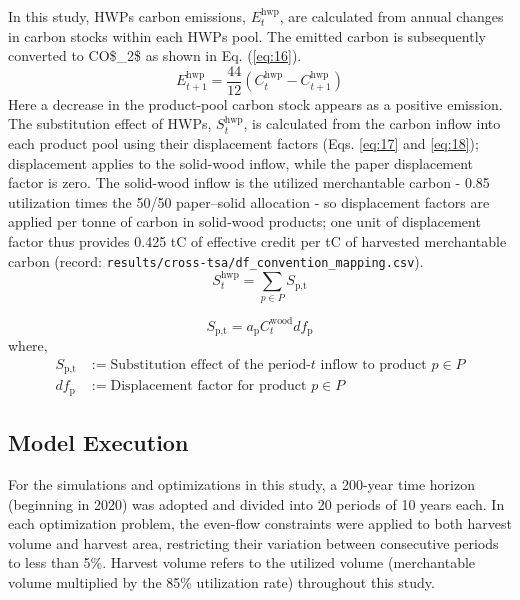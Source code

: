 \documentclass[preprint,12pt,authoryear]{elsarticle}
\begin{document}
\begin{linenumbers}
In this study, \acp{HWP} carbon emissions, $E_t^{\text{hwp}}$, are calculated from annual changes in carbon stocks within each \acp{HWP} pool. The emitted carbon is subsequently converted to \ac{CO$_2$} as shown in Eq. (\ref{eq:16}).
\begin{equation}
E_{t+1}^{\text{hwp}} = \frac{44}{12}(C_{t}^{\text{hwp}} - C_{t+1}^{\text{hwp}})
\label{eq:16}
\end{equation}
Here a decrease in the product-pool carbon stock appears as a positive emission.
The substitution effect of \acp{HWP}, $S_t^{\text{hwp}}$, is calculated from the carbon inflow into each product pool using their displacement factors (Eqs. \ref{eq:17} and \ref{eq:18}); displacement applies to the solid-wood inflow, while the paper displacement factor is zero. The solid-wood inflow is the utilized merchantable carbon - 0.85 utilization times the 50/50 paper--solid allocation - so displacement factors are applied per tonne of carbon in solid-wood products; one unit of displacement factor thus provides 0.425 tC of effective credit per tC of harvested merchantable carbon (record: \texttt{results/cross-tsa/df\_convention\_mapping.csv}). 
\begin{equation}
S_t^{\text{hwp}} = \sum_{p \in P}S_{\text{p,t}}
\label{eq:17}
\end{equation}

\begin{equation}
S_{\text{p,t}} = a_{\text{p}}C_t^{\text{wood}}df_{\text{p}}
\label{eq:18}
\end{equation}
where, 
\begin{align*}
    S_{\text{p,t}} &:= \text{Substitution effect of the period-}t\text{ inflow to product } p \in P \\
    df_{\text{p}} &:= \text{Displacement factor for product $p \in P$ } \end{align*}

\subsection{Model Execution}
\label{sec: Model Execution}
For the simulations and optimizations in this study, a 200-year time horizon (beginning in 2020) was adopted and divided into 20 periods of 10 years each. In each optimization problem, the even-flow constraints were applied to both harvest volume and harvest area, restricting their variation between consecutive periods to less than 5\%. Harvest volume refers to the utilized volume (merchantable volume multiplied by the 85\% utilization rate) throughout this study.


\end{linenumbers}
\end{document}
